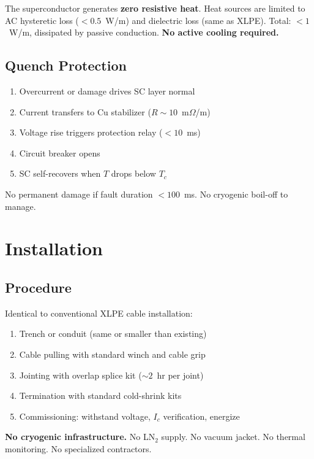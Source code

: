 \documentclass[11pt, a4paper]{article}
\begin{document}
The superconductor generates \textbf{zero resistive heat}. Heat
sources are limited to AC hysteretic loss ($< 0.5$~W/m) and
dielectric loss (same as XLPE). Total: $< 1$~W/m, dissipated by
passive conduction. \textbf{No active cooling required.}

\subsection{Quench Protection}

\begin{enumerate}[nosep]
  \item Overcurrent or damage drives SC layer normal
  \item Current transfers to Cu stabilizer ($R \sim 10$~m$\Omega$/m)
  \item Voltage rise triggers protection relay ($< 10$~ms)
  \item Circuit breaker opens
  \item SC self-recovers when $T$ drops below $T_c$
\end{enumerate}

No permanent damage if fault duration $< 100$~ms. No cryogenic
boil-off to manage.

\section{Installation}
\label{sec:installation}

\subsection{Procedure}

Identical to conventional XLPE cable installation:

\begin{enumerate}[nosep]
  \item Trench or conduit (same or smaller than existing)
  \item Cable pulling with standard winch and cable grip
  \item Jointing with overlap splice kit ($\sim 2$~hr per joint)
  \item Termination with standard cold-shrink kits
  \item Commissioning: withstand voltage, $I_c$ verification, energize
\end{enumerate}

\textbf{No cryogenic infrastructure.} No LN$_2$ supply. No vacuum
jacket. No thermal monitoring. No specialized contractors.
\end{document}
